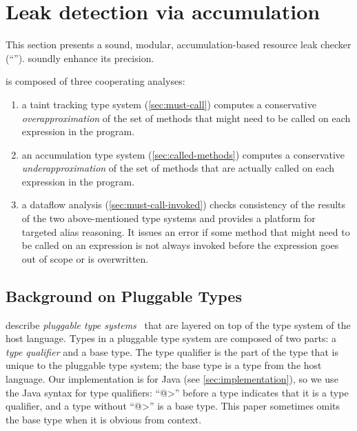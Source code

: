 
\section{Leak detection via accumulation}
\label{sec:base-type-systems}

This section presents a sound, modular, accumulation-based
resource leak checker (``\tool'').
soundly enhance its precision.

\Tool is composed of three cooperating analyses:
\begin{enumerate}
\item a taint tracking type system (\cref{sec:must-call}) computes a conservative
  \emph{overapproximation} of the set of methods that might need to be called
  on each expression in the program.
\item an accumulation type system (\cref{sec:called-methods}) computes
  a conservative \emph{underapproximation} of the set of methods that are
  actually called on each expression in the program.
\item a dataflow analysis (\cref{sec:must-call-invoked}) checks consistency of the results of the two
  above-mentioned type systems and provides a platform for targeted alias reasoning.  It issues an error if some
  method that might need to be called on an expression is not always invoked before the
  expression goes out of scope or is overwritten.
\end{enumerate}



\subsection{Background on Pluggable Types}
\label{sec:background}

 describe
\emph{pluggable type systems}~\cite{FosterFFA99}
that are layered on top of the type system of the host
language.  Types in a pluggable type system are composed of two parts:
a \emph{type qualifier} and a base type. The type qualifier is the
part of the type that is unique to the pluggable type system; the base
type is a type from the host language. Our implementation is for Java
(see \cref{sec:implementation}), so we use the Java syntax for type
qualifiers: ``\<@>'' before a type indicates that it is a type
qualifier, and a type without ``\<@>'' is a base type.
This paper sometimes omits the base type when it is obvious from context.

